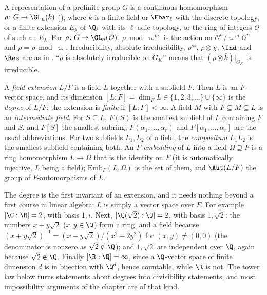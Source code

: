 \begin{convention}[Representations]\label{conv:galois:reps}
A representation of a profinite group $G$ is a continuous homomorphism $\rho\colon G\to\GL_n(k)$ (), where $k$ is a finite
field or $\Fbar_\ell$ with the discrete topology, or a finite extension $E_\lambda$ of $\Q_\ell$ with its $\ell$-adic topology, or the ring of integers
$\mathcal{O}$ of such an $E_\lambda$. For $\rho\colon G\to\GL_n(\mathcal{O})$, $\rho\bmod\varpi^m$ is the action on $\mathcal{O}^n/\varpi^m\mathcal{O}^n$ and
$\bar\rho=\rho\bmod\varpi$. Irreducibility, absolute irreducibility, $\rho^{ss}$, $\rho\otimes\chi$, $\Ind$ and $\Res$ are as in .
``$\rho$ is absolutely irreducible on $G_K$'' means that $(\rho\otimes\bar k)|_{G_K}$ is irreducible.
\end{convention}

\begin{definition}\label{def:galois:extension}
A \emph{field extension} $L/F$ is a field $L$ together with a subfield $F$. Then $L$ is an $F$-vector space, and its dimension $[L:F]=\dim_FL\in
\{1,2,3,\dots\}\cup\{\infty\}$ is the \emph{degree} of $L/F$; the extension is \emph{finite} if $[L:F]<\infty$. A field $M$ with $F\subseteq M\subseteq L$ is an
\emph{intermediate field}. For $S\subseteq L$, $F(S)$ is the smallest subfield of $L$ containing $F$ and $S$, and $F[S]$ the smallest subring; $F(\alpha_1,
\dots,\alpha_r)$ and $F[\alpha_1,\dots,\alpha_r]$ are the usual abbreviations. For two subfields $L_1,L_2$ of a field, the \emph{compositum} $L_1L_2$ is the
smallest subfield containing both. An \emph{$F$-embedding} of $L$ into a field $\Omega\supseteq F$ is a ring homomorphism $L\to\Omega$ that is the identity on
$F$ (it is automatically injective, $L$ being a field); $\mathrm{Emb}_F(L,\Omega)$ is the set of them, and $\Aut(L/F)$ the group of $F$-automorphisms of $L$.
\end{definition}

The degree is the first invariant of an extension, and it needs nothing beyond a first course in linear algebra: $L$ is simply a vector space over $F$.
For example $[\C:\R]=2$, with basis $1,i$. Next, $[\Q(\sqrt2):\Q]=2$, with basis $1,\sqrt2$: the numbers $x+y\sqrt2$ ($x,y\in\Q$) form a ring, and a field
because $(x+y\sqrt2)^{-1}=(x-y\sqrt2)/(x^2-2y^2)$ for $(x,y)\ne(0,0)$ (the denominator is nonzero as $\sqrt2\notin\Q$); and $1,\sqrt2$ are independent over $\Q$, again
because $\sqrt2\notin\Q$. Finally $[\R:\Q]=\infty$, since a $\Q$-vector space of finite dimension $d$ is in bijection with $\Q^d$, hence countable, while $\R$ is not.
The tower law below turns statements about degrees into divisibility statements, and most impossibility arguments of the chapter are of that kind.

